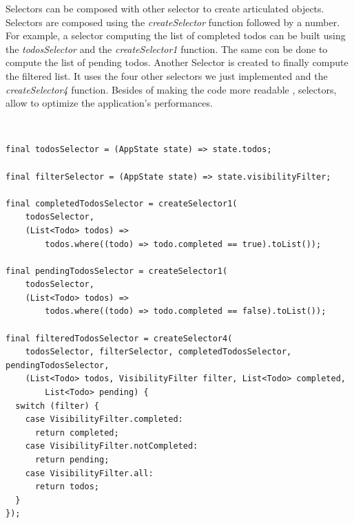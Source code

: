 Selectors can be composed with other selector to create articulated objects. Selectors are composed using the \textit{createSelector} function followed by a number. For example, a selector computing the list of completed todos can be built using the \textit{todosSelector }and the \textit{createSelector1} function. The same con be done to compute the list of pending todos. Another Selector is created to finally compute the filtered list. It uses the four other selectors we just implemented and the \textit{createSelector4 }function. Besides of making the code more readable , selectors, allow to optimize the application's performances.
\begin{code}
\mbox{}\\
 \mbox{}
		\label{code:2.14}
\begin{verbatim}
final todosSelector = (AppState state) => state.todos;

final filterSelector = (AppState state) => state.visibilityFilter;

final completedTodosSelector = createSelector1(
    todosSelector,
    (List<Todo> todos) =>
        todos.where((todo) => todo.completed == true).toList());

final pendingTodosSelector = createSelector1(
    todosSelector,
    (List<Todo> todos) =>
        todos.where((todo) => todo.completed == false).toList());

final filteredTodosSelector = createSelector4(
    todosSelector, filterSelector, completedTodosSelector, pendingTodosSelector,
    (List<Todo> todos, VisibilityFilter filter, List<Todo> completed,
        List<Todo> pending) {
  switch (filter) {
    case VisibilityFilter.completed:
      return completed;
    case VisibilityFilter.notCompleted:
      return pending;
    case VisibilityFilter.all:
      return todos;
  }
});
\end{verbatim}
\mbox{}
\end{code}

